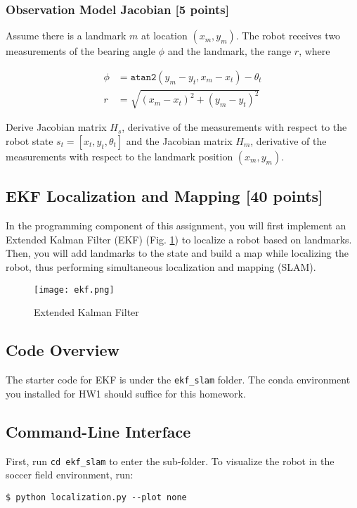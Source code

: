 \documentclass{article}
\begin{document}
\subsubsection{Observation Model Jacobian [5 points]}
Assume there is a landmark $m$ at location $(x_{m},y_{m})$. The robot receives two measurements of the bearing angle $\phi$ and the landmark, the range $r$, where

\begin{align*}
    \phi &= \texttt{atan2}(y_{m}-y_{t},x_{m}-x_{t})-\theta_{t} \\
    r &= \sqrt{(x_{m}-x_{t})^{2}+(y_{m}-y_{t})^{2}}
\end{align*}

Derive Jacobian matrix $H_{s}$, derivative of the measurements with respect to the robot state $s_{t}=[x_{t},y_{t},\theta_{t}]$ and the Jacobian matrix $H_{m}$, derivative of the measurements with respect to the landmark position $(x_{m},y_{m})$.

\subsection{EKF Localization and Mapping [40 points]}
In the programming component of this assignment, you will first implement an Extended Kalman Filter (EKF) (Fig. \ref{fig:ekf}) to localize a robot based on landmarks. Then, you will add landmarks to the state and build a map while localizing the robot, thus performing simultaneous localization and mapping (SLAM).

\begin{figure}[h]
    \centering
    \texttt{[image: ekf.png]}
    \caption{Extended Kalman Filter}
    \label{fig:ekf}
\end{figure}

\subsection*{Code Overview}
The starter code for EKF is under the \texttt{ekf\_slam} folder. The conda environment you installed for HW1 should suffice for this homework.

\subsection*{Command-Line Interface}
First, run \texttt{cd ekf\_slam} to enter the sub-folder. To visualize the robot in the soccer field environment, run:

\begin{verbatim}
$ python localization.py --plot none
\end{verbatim}
\end{document}
